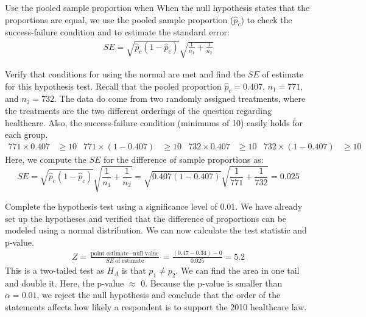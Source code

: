 \begin{onebox}{Use the pooled sample proportion when }
When the null hypothesis states that the proportions are equal, we use the pooled sample proportion ($\hat{p}_c$) to check the success-failure condition and to estimate the standard error:
\begin{eqnarray*}
SE =\sqrt{\hat{p}_c(1-\hat{p}_c)}\sqrt{\frac{1}{n_1} + \frac{1}{n_2}}
\label{seOfDiffInPropUsingPooledEstimate}
\end{eqnarray*}
\end{onebox}



\begin{examplewrap}
\begin{nexample}{Verify that conditions for using the normal are met and find the $SE$ of estimate for this hypothesis test.  Recall that the pooled proportion $\hat{p}_c=0.407$, $n_1 = 771$, and $n_2=732$.}
The data do come from two randomly assigned treatments, where the treatments are the two different orderings of the question regarding healthcare.  Also, the success-failure condition (minimums of 10) easily holds for each group.
\begin{align*}
771 \times 0.407 &\ge 10
	&771 \times (1-0.407) &\ge 10
	&732 \times 0.407 &\ge 10
	&732 \times (1-0.407) &\ge 10
\end{align*}
Here, we compute the $SE$ for the difference of sample proportions as:
$$SE =\sqrt{\hat{p}_c(1-\hat{p}_c)}\sqrt{\frac{1}{n_1} + \frac{1}{n_2}}=\sqrt{0.407(1-0.407)}\sqrt{\frac{1}{771} + \frac{1}{732}}=0.025$$
\end{nexample}
\end{examplewrap}



\begin{examplewrap}
\begin{nexample}{Complete the hypothesis test using a significance level of 0.01.}
We have already set up the hypotheses and verified that the difference of proportions can be modeled using a normal distribution.  We can now calculate the test statistic and p-value.  
\begin{eqnarray*}
Z = \frac{\text{point estimate} - \text{null value}}{SE\ \text{of estimate}}= \frac{(0.47-0.34) - 0}{0.025} = 5.2
\end{eqnarray*}
This is a two-tailed test as $H_A$ is that $p_1\ne p_2$.  We can find the area in one tail and double it.  Here, the p-value $\approx$ 0.  Because the p-value is smaller than $\alpha = 0.01$, we reject the null hypothesis and conclude that the order of the statements affects how likely a respondent is to support the 2010 healthcare law.
\end{nexample}
\end{examplewrap}
 
